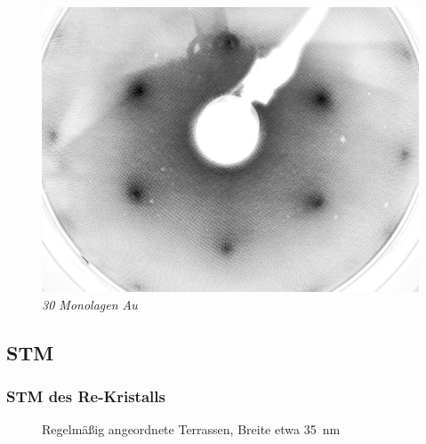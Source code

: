 \documentclass{beamer}
\begin{document}
\begin{frame}
\begin{minipage}{\linewidth}
\begin{figure}[H]
\begin{minipage}[b]{0.3\textwidth}
		\includegraphics[width=\textwidth]{bilder/30ML_E208}
		\caption*{\textit{30 Monolagen Au}}
	\end{minipage}
\end{figure}
\end{minipage}
\end{frame}



\subsection[Ergebnisse]{STM}

\begin{frame}
\frametitle{STM des Re-Kristalls}
\begin{figure}[htbp]
	\vspace{-0.5cm}
	\begin{minipage}[b]{0.45\textwidth} 
		\sffamily
		
	\end{minipage}
	\hspace{0.5cm}
	\begin{minipage}[b]{0.45\textwidth}
		\sffamily
		
	\end{minipage}
	\caption*{Regelmäßig angeordnete Terrassen, Breite etwa \SI{35}{nm}}
	\end{figure}
\end{frame}
\end{document}
